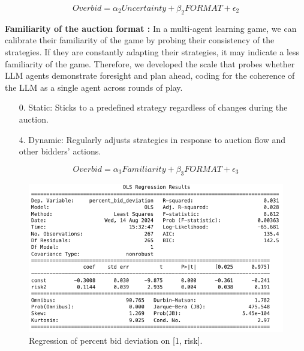 \documentclass{article} %
\begin{document}
\begin{equation}
    Overbid = \alpha_2 Uncertainty  + \beta_2  FORMAT + \epsilon_2
\end{equation}


\textbf{Familiarity of the auction format :}
In a multi-agent learning game, we can calibrate their familiarity of the game by probing their consistency of the strategies.
If they are constantly adapting their strategies, it may indicate a less familiarity of the game.
Therefore, we developed the scale that probes whether LLM agents demonstrate foresight and plan ahead, coding for the coherence of the LLM as a single agent across rounds of play.

\begin{enumerate}
    \item[0.] Static: Sticks to a predefined strategy regardless of changes during the auction.
    \item[4.] Dynamic: Regularly adjusts strategies in response to auction flow and other bidders’ actions.
\end{enumerate}

\begin{equation}
    Overbid = \alpha_3 Familiarity + \beta_3 FORMAT + \epsilon_3
\end{equation}

\begin{figure}
    \centering
    \includegraphics[width=0.75\linewidth]{Figs/risk-regression.png}
    \caption{Regression of percent bid deviation on [1, risk].}
    \label{fig:risk-reg}
\end{figure}


\end{document}
